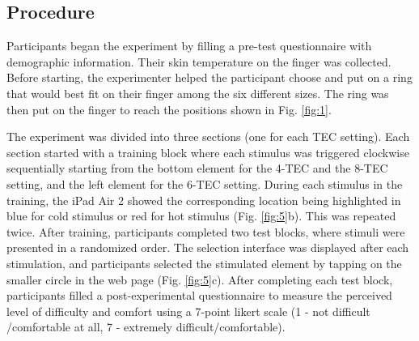 \documentclass[preprint,12pt]{elsarticle}
\begin{document}
\subsection{Procedure}

Participants began the experiment by filling a pre-test questionnaire with demographic information. Their skin temperature on the finger was collected. Before starting, the experimenter helped the participant choose and put on a ring that would best fit on their finger among the six different sizes. The ring was then put on the finger to reach the positions shown in Fig. \ref{fig:1}.

The experiment was divided into three sections (one for each TEC setting). Each section started with a training block where each stimulus was triggered clockwise sequentially starting from the bottom element for the 4-TEC and the 8-TEC setting, and the left element for the 6-TEC setting. During each stimulus in the training, the iPad Air 2 showed the corresponding location being highlighted in blue for cold stimulus or red for hot stimulus (Fig.  \ref{fig:5}b). This was repeated twice. After training, participants completed two test blocks, where stimuli were presented in a randomized order. The selection interface was displayed after each stimulation, and participants selected the stimulated element by tapping on the smaller circle in the web page (Fig.  \ref{fig:5}c). After completing each test block, participants filled a post-experimental questionnaire to measure the perceived level of difficulty and comfort using a 7-point likert scale (1 - not difficult /comfortable at all, 7 - extremely difficult/comfortable).
\end{document}
